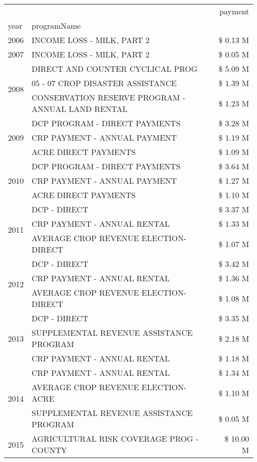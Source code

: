 \begin{tabular}{llr}
\toprule
 &  & payment \\
year & programName &  \\
\midrule
2006 & INCOME LOSS - MILK, PART 2 & \$ 0.13 M \\
\cline{1-3}
2007 & INCOME LOSS - MILK, PART 2 & \$ 0.05 M \\
\cline{1-3}
\multirow[t]{3}{*}{2008} & DIRECT AND COUNTER CYCLICAL PROG & \$ 5.09 M \\
 & 05 - 07 CROP DISASTER ASSISTANCE & \$ 1.39 M \\
 & CONSERVATION RESERVE PROGRAM - ANNUAL LAND RENTAL & \$ 1.23 M \\
\cline{1-3}
\multirow[t]{3}{*}{2009} & DCP PROGRAM - DIRECT PAYMENTS & \$ 3.28 M \\
 & CRP PAYMENT - ANNUAL PAYMENT & \$ 1.19 M \\
 & ACRE DIRECT PAYMENTS & \$ 1.09 M \\
\cline{1-3}
\multirow[t]{3}{*}{2010} & DCP PROGRAM - DIRECT PAYMENTS & \$ 3.64 M \\
 & CRP PAYMENT - ANNUAL PAYMENT & \$ 1.27 M \\
 & ACRE DIRECT PAYMENTS & \$ 1.10 M \\
\cline{1-3}
\multirow[t]{3}{*}{2011} & DCP - DIRECT & \$ 3.37 M \\
 & CRP PAYMENT - ANNUAL RENTAL & \$ 1.33 M \\
 & AVERAGE CROP REVENUE ELECTION-DIRECT & \$ 1.07 M \\
\cline{1-3}
\multirow[t]{3}{*}{2012} & DCP - DIRECT & \$ 3.42 M \\
 & CRP PAYMENT - ANNUAL RENTAL & \$ 1.36 M \\
 & AVERAGE CROP REVENUE ELECTION-DIRECT & \$ 1.08 M \\
\cline{1-3}
\multirow[t]{3}{*}{2013} & DCP - DIRECT & \$ 3.35 M \\
 & SUPPLEMENTAL REVENUE ASSISTANCE PROGRAM & \$ 2.18 M \\
 & CRP PAYMENT - ANNUAL RENTAL & \$ 1.18 M \\
\cline{1-3}
\multirow[t]{3}{*}{2014} & CRP PAYMENT - ANNUAL RENTAL & \$ 1.34 M \\
 & AVERAGE CROP REVENUE ELECTION-ACRE & \$ 1.10 M \\
 & SUPPLEMENTAL REVENUE ASSISTANCE PROGRAM & \$ 0.05 M \\
\cline{1-3}
\multirow[t]{3}{*}{2015} & AGRICULTURAL RISK COVERAGE PROG - COUNTY & \$ 10.00 M \\

\end{tabular}
